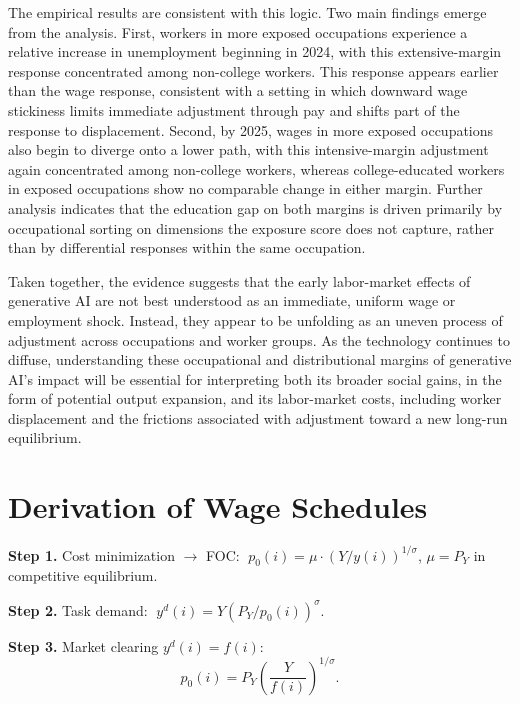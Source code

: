 \documentclass[11pt]{article}
\theoremstyle{plain}
\theoremstyle{remark}
\begin{document}
The empirical results are consistent with this logic. Two main findings emerge from the analysis. First, workers in more exposed occupations experience a relative increase in unemployment beginning in 2024, with this extensive-margin response concentrated among non-college workers. This response appears earlier than the wage response, consistent with a setting in which downward wage stickiness limits immediate adjustment through pay and shifts part of the response to displacement. Second, by 2025, wages in more exposed occupations also begin to diverge onto a lower path, with this intensive-margin adjustment again concentrated among non-college workers, whereas college-educated workers in exposed occupations show no comparable change in either margin. Further analysis indicates that the education gap on both margins is driven primarily by occupational sorting on dimensions the exposure score does not capture, rather than by differential responses within the same occupation.


Taken together, the evidence suggests that the early labor-market effects of generative AI are not best understood as an immediate, uniform wage or employment shock. Instead, they appear to be unfolding as an uneven process of adjustment across occupations and worker groups. As the technology continues to diffuse, understanding these occupational and distributional margins of generative AI's impact will be essential for interpreting both its broader social gains, in the form of potential output expansion, and its labor-market costs, including worker displacement and the frictions associated with adjustment toward a new long-run equilibrium.


\clearpage
\printbibliography
\clearpage
\appendix

\section{Derivation of Wage Schedules}
\label{app:foc}

\noindent\textbf{Step 1.} Cost minimization $\to$ FOC:
$\;p_0(i)=\mu\cdot(Y/y(i))^{1/\sigma}$, \quad $\mu=P_Y$ in competitive equilibrium.

\medskip\noindent\textbf{Step 2.} Task demand:
$\;y^d(i)=Y(P_Y/p_0(i))^{\sigma}$.

\medskip\noindent\textbf{Step 3.} Market clearing $y^d(i)=f(i)$:
\[
  p_0(i) = P_Y\!\left(\frac{Y}{f(i)}\right)^{\!1/\sigma}.
\]
\end{document}
